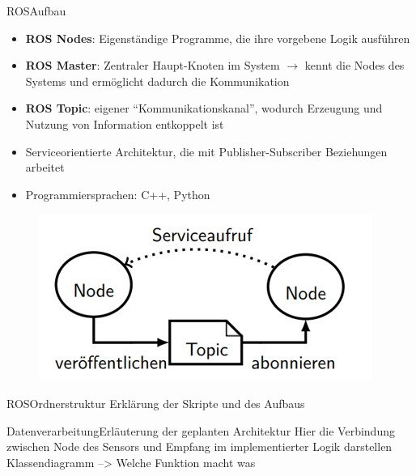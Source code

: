 \documentclass[169, handout	]{THIbeamer} %
\begin{document}
	\begin{frame}{ROS}{Aufbau}
		\begin{itemize}
			\item \textbf{ROS Nodes}: Eigenständige Programme, die ihre vorgebene Logik ausführen
			\item \textbf{ROS Master}: Zentraler Haupt-Knoten im System $\rightarrow$ kennt die Nodes des Systems und ermöglicht dadurch die Kommunikation 
			\item \textbf{ROS Topic}: eigener \enquote{Kommunikationskanal}, wodurch Erzeugung und Nutzung von Information entkoppelt ist
			\item Serviceorientierte Architektur, die mit Publisher-Subscriber Beziehungen arbeitet
			\item Programmiersprachen: C++, Python 
		\end{itemize}				
		\begin{figure}
			\includegraphics[scale=0.5]{required/ROS-Aufbau.jpg}
		\end{figure}
	\end{frame}
	\begin{frame}{ROS}{Ordnerstruktur}
		Erklärung der Skripte und des Aufbaus
	\end{frame}
	\begin{frame}{Datenverarbeitung}{Erläuterung der geplanten Architektur}
		Hier die Verbindung zwischen Node des Sensors und Empfang im implementierter Logik darstellen
		Klassendiagramm --> Welche Funktion macht was
	\end{frame}
\end{document}
